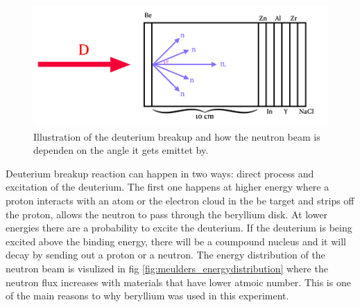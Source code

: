 \documentclass[twoside,english]{uiofysmaster/uiofysmaster}
\begin{document}
\begin{figure} [h!]
   \centering
   \includegraphics[width=1\linewidth]{D_to_n}
   \caption{Illustration of the deuterium breakup and how the neutron beam is dependen on the angle it gets emittet by.}
   \label{fig:D_to_n}
\end{figure}
\noindent
Deuterium breakup reaction can happen in two ways: direct process and excitation of the deuterium. The first one happens at higher energy where a proton interacts with an atom or the  electron cloud in the be target and strips off the proton, allows the neutron to pass through the beryllium disk.  At lower energies there are a probability to excite the deuterium. If the deuterium is being excited above the binding energy, there will be a coumpound nucleus and it will decay by sending out a proton or a neutron. The energy distribution of the neutron beam is visulized in fig \ref{fig:meulders_energydistribution} where the neutron flux increases with materials that have lower atmoic number. This is one of the main reasons to why beryllium was used in this experiment.
\end{document}

